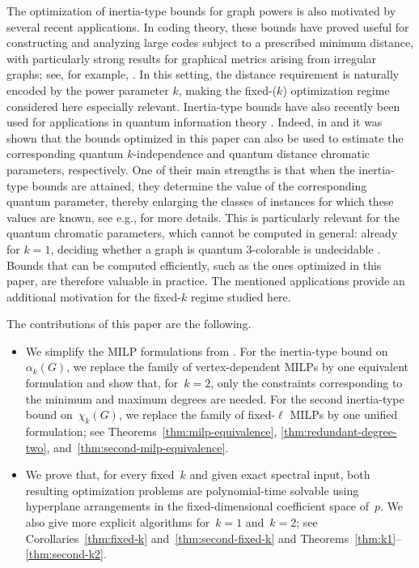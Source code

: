 \documentclass[10pt]{article}
\begin{document}
The optimization of inertia-type bounds for graph powers is also motivated by several recent applications. In coding theory, these bounds have proved useful for constructing and analyzing large codes subject to a prescribed minimum distance, with particularly strong results for graphical metrics arising from irregular graphs; see, for example, \cite{Abiad2024EigenvalueCodesb,APR2025}. In this setting, the distance requirement is naturally encoded by the power parameter $k$, making the fixed-($k$) optimization regime considered here especially relevant. Inertia-type bounds have also recently been used for applications in quantum information theory \cite{wea2020,AJ2025}. Indeed, in \cite{wea2020} and \cite{AJ2025,ELPHICK2019338} it was shown that the bounds optimized in this paper can also be used to estimate the corresponding quantum $k$-independence and quantum distance chromatic parameters, respectively. One of their main strengths is that when the inertia-type bounds are attained, they determine the value of the corresponding quantum parameter, thereby enlarging the classes of instances for which these values are known, see e.g., \cite[Section 5]{wea2020} for more details. This is particularly relevant for the quantum chromatic parameters, which cannot be computed in general: already for \(k=1\), deciding whether a graph is quantum \(3\)-colorable is undecidable \cite[Corollary~4.13]{Harris2024}. Bounds that can be computed efficiently, such as the ones optimized in this paper, are therefore valuable in practice. The mentioned applications provide an additional motivation for the fixed-\(k\) regime studied here.

The contributions of this paper are the following.
\begin{itemize}
    \item We simplify the MILP formulations from \cite{acfns2020}. For the inertia-type bound on~\(\alpha_k(G)\), we replace the family of vertex-dependent MILPs by one equivalent formulation and show that, for~\(k=2\), only the constraints corresponding to the minimum and maximum degrees are needed. For the second inertia-type bound on~\(\chi_k(G)\), we replace the family of fixed-\(\ell\) MILPs by one unified formulation; see Theorems~\ref{thm:milp-equivalence}, \ref{thm:redundant-degree-two}, and~\ref{thm:second-milp-equivalence}.

    \item We prove that, for every fixed~\(k\) and given exact spectral input, both resulting optimization problems are polynomial-time solvable using hyperplane arrangements in the fixed-dimensional coefficient space of~\(p\). We also give more explicit algorithms for~\(k=1\) and~\(k=2\); see Corollaries~\ref{thm:fixed-k} and~\ref{thm:second-fixed-k} and Theorems~\ref{thm:k1}--\ref{thm:second-k2}.
\end{itemize}
\end{document}
